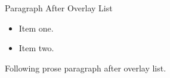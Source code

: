 \documentclass[14pt,t]{beamer-accessibility}
\begin{document}
\begin{frame}{Paragraph After Overlay List}
\begin{itemize}
\item<1-> Item one.
\item<2-> Item two.
\end{itemize}
Following prose paragraph after overlay list.
\end{frame}
\end{document}
